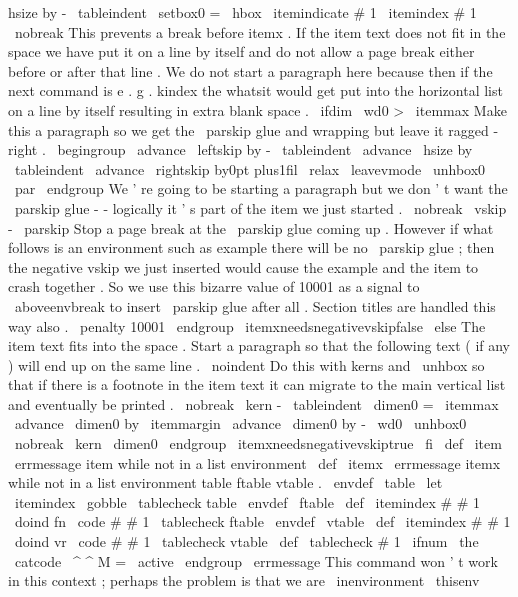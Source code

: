 {{{{hsize
by
-
\
tableindent
\
setbox0
=
\
hbox
{
\
itemindicate
{
#
1
}
}
%
\
itemindex
{
#
1
}
%
\
nobreak
%
This
prevents
a
break
before
itemx
.
%
%
If
the
item
text
does
not
fit
in
the
space
we
have
put
it
on
a
line
%
by
itself
and
do
not
allow
a
page
break
either
before
or
after
that
%
line
.
We
do
not
start
a
paragraph
here
because
then
if
the
next
%
command
is
e
.
g
.
kindex
the
whatsit
would
get
put
into
the
%
horizontal
list
on
a
line
by
itself
resulting
in
extra
blank
space
.
\
ifdim
\
wd0
>
\
itemmax
%
%
Make
this
a
paragraph
so
we
get
the
\
parskip
glue
and
wrapping
%
but
leave
it
ragged
-
right
.
\
begingroup
\
advance
\
leftskip
by
-
\
tableindent
\
advance
\
hsize
by
\
tableindent
\
advance
\
rightskip
by0pt
plus1fil
\
relax
\
leavevmode
\
unhbox0
\
par
\
endgroup
%
%
We
'
re
going
to
be
starting
a
paragraph
but
we
don
'
t
want
the
%
\
parskip
glue
-
-
logically
it
'
s
part
of
the
item
we
just
started
.
\
nobreak
\
vskip
-
\
parskip
%
%
Stop
a
page
break
at
the
\
parskip
glue
coming
up
.
However
if
%
what
follows
is
an
environment
such
as
example
there
will
be
no
%
\
parskip
glue
;
then
the
negative
vskip
we
just
inserted
would
%
cause
the
example
and
the
item
to
crash
together
.
So
we
use
this
%
bizarre
value
of
10001
as
a
signal
to
\
aboveenvbreak
to
insert
%
\
parskip
glue
after
all
.
Section
titles
are
handled
this
way
also
.
%
\
penalty
10001
\
endgroup
\
itemxneedsnegativevskipfalse
\
else
%
The
item
text
fits
into
the
space
.
Start
a
paragraph
so
that
the
%
following
text
(
if
any
)
will
end
up
on
the
same
line
.
\
noindent
%
Do
this
with
kerns
and
\
unhbox
so
that
if
there
is
a
footnote
in
%
the
item
text
it
can
migrate
to
the
main
vertical
list
and
%
eventually
be
printed
.
\
nobreak
\
kern
-
\
tableindent
\
dimen0
=
\
itemmax
\
advance
\
dimen0
by
\
itemmargin
\
advance
\
dimen0
by
-
\
wd0
\
unhbox0
\
nobreak
\
kern
\
dimen0
\
endgroup
\
itemxneedsnegativevskiptrue
\
fi
}
\
def
\
item
{
\
errmessage
{
item
while
not
in
a
list
environment
}
}
\
def
\
itemx
{
\
errmessage
{
itemx
while
not
in
a
list
environment
}
}
%
table
ftable
vtable
.
\
envdef
\
table
{
%
\
let
\
itemindex
\
gobble
\
tablecheck
{
table
}
%
}
\
envdef
\
ftable
{
%
\
def
\
itemindex
#
#
1
{
\
doind
{
fn
}
{
\
code
{
#
#
1
}
}
}
%
\
tablecheck
{
ftable
}
%
}
\
envdef
\
vtable
{
%
\
def
\
itemindex
#
#
1
{
\
doind
{
vr
}
{
\
code
{
#
#
1
}
}
}
%
\
tablecheck
{
vtable
}
%
}
\
def
\
tablecheck
#
1
{
%
\
ifnum
\
the
\
catcode
\
^
^
M
=
\
active
\
endgroup
\
errmessage
{
This
command
won
'
t
work
in
this
context
;
perhaps
the
problem
is
that
we
are
\
inenvironment
\
thisenv
}}}}}
